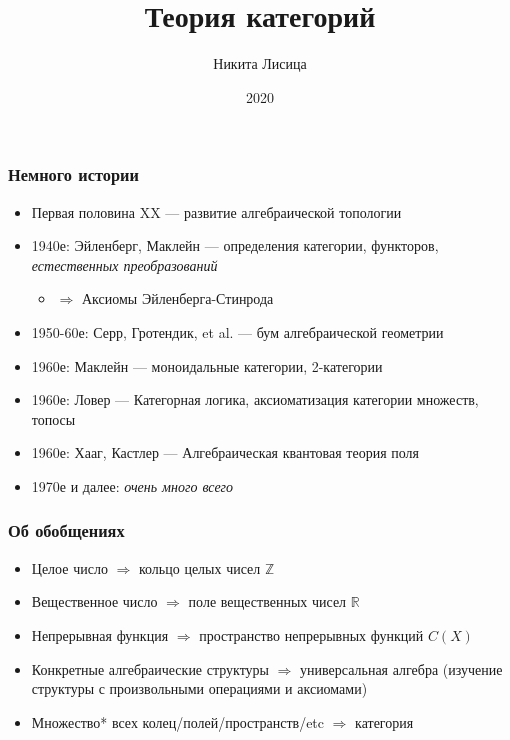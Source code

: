 \documentclass{beamer}
\title{Теория категорий}
\author{Никита Лисица}
\date{2020}
\begin{document}
\frame{\titlepage}

\begin{frame}
\frametitle{Немного истории}
\begin{itemize}
\pause
\item Первая половина XX --- развитие алгебраической топологии
\pause
\item 1940е: Эйленберг, Маклейн --- определения категории, функторов, \textit{естественных преобразований}
\pause
\begin{itemize}
\item \(\Rightarrow\) Аксиомы Эйленберга-Стинрода
\end{itemize}
\pause
\item 1950-60е: Серр, Гротендик, et al. --- бум алгебраической геометрии
\pause
\item 1960е: Маклейн --- моноидальные категории, 2-категории
\pause
\item 1960е: Ловер --- Категорная логика, аксиоматизация категории множеств, топосы
\pause
\item 1960е: Хааг, Кастлер --- Алгебраическая квантовая теория поля
\pause
\item 1970е и далее: \textit{очень много всего}
\end{itemize}
\end{frame}

\begin{frame}
\frametitle{Об обобщениях}
\begin{itemize}
\pause
\item Целое число \pause \begin{math}\Rightarrow\end{math} кольцо целых чисел \begin{math}\mathbb{Z}\end{math} \pause
\item Вещественное число \pause \begin{math}\Rightarrow\end{math} поле вещественных чисел \begin{math}\mathbb{R}\end{math} \pause
\item Непрерывная функция \pause \begin{math}\Rightarrow\end{math} пространство непрерывных функций \begin{math}C(X)\end{math} \pause
\item Конкретные алгебраические структуры \pause \begin{math}\Rightarrow\end{math} универсальная алгебра (изучение структуры с произвольными операциями и аксиомами) \pause
\item Множество* всех колец/полей/пространств/etc \begin{math}\Rightarrow\end{math}  \pause категория
\end{itemize}
\end{frame}
\end{document}
